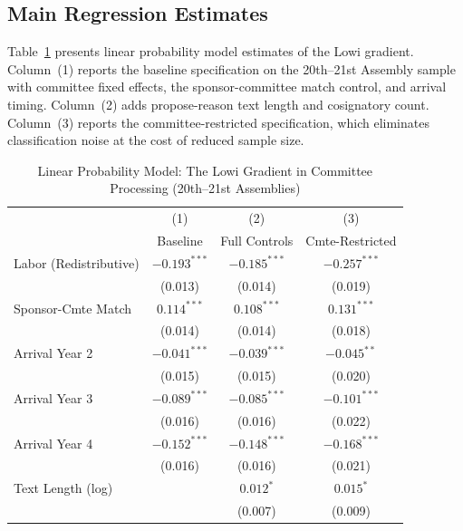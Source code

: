 \documentclass[11pt]{article}
\begin{document}
\subsection{Main Regression Estimates}
\label{sec:results-reg}

Table~\ref{tab:main} presents linear probability model estimates of the Lowi gradient. Column~(1) reports the baseline specification on the 20th--21st Assembly sample with committee fixed effects, the sponsor-committee match control, and arrival timing. Column~(2) adds propose-reason text length and cosignatory count. Column~(3) reports the committee-restricted specification, which eliminates classification noise at the cost of reduced sample size.

\begin{table}[H]
\centering
\caption{Linear Probability Model: The Lowi Gradient in Committee Processing (20th--21st Assemblies)}
\label{tab:main}
\begin{tabular}{lccc}
\toprule
 & (1) & (2) & (3) \\
 & Baseline & Full Controls & Cmte-Restricted \\
\midrule
Labor (Redistributive)  & $-0.193^{***}$ & $-0.185^{***}$ & $-0.257^{***}$ \\
                         & (0.013)        & (0.014)        & (0.019)        \\[4pt]
Sponsor-Cmte Match       & $0.114^{***}$  & $0.108^{***}$  & $0.131^{***}$  \\
                         & (0.014)        & (0.014)        & (0.018)        \\[4pt]
Arrival Year 2           & $-0.041^{***}$ & $-0.039^{***}$ & $-0.045^{**}$  \\
                         & (0.015)        & (0.015)        & (0.020)        \\[4pt]
Arrival Year 3           & $-0.089^{***}$ & $-0.085^{***}$ & $-0.101^{***}$ \\
                         & (0.016)        & (0.016)        & (0.022)        \\[4pt]
Arrival Year 4           & $-0.152^{***}$ & $-0.148^{***}$ & $-0.168^{***}$ \\
                         & (0.016)        & (0.016)        & (0.021)        \\[4pt]
Text Length (log)        &                & $0.012^{*}$    & $0.015^{*}$    \\
                         &                & (0.007)        & (0.009)        \\[4pt]

\end{tabular}
\end{table}
\end{document}
